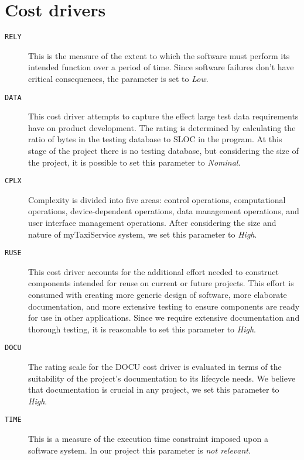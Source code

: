 \section{Cost drivers}

\begin{description}


	\item [\normalfont\texttt{RELY}] This is the measure of the extent to which the software must perform its intended function over a period of time. Since software failures don't have critical consequences, the parameter is set to \emph{Low}.

	\item [\normalfont\texttt{DATA}] This cost driver attempts to capture the effect large test data requirements have on product development. The rating is determined by calculating the ratio of bytes in the testing database to SLOC in the program. At this stage of the project there is no testing database, but considering the size of the project, it is possible to set this parameter to \emph{Nominal}.

	\item [\normalfont\texttt{CPLX}] Complexity is divided into five areas: control operations, computational operations, \mbox{device-dependent} operations, data management operations, and user interface management operations. After considering the size and nature of myTaxiService system, we set this parameter to \emph{High}.

	\item [\normalfont\texttt{RUSE}] This cost driver accounts for the additional effort needed to construct components intended for reuse on current or future projects. This effort is consumed with creating more generic design of software, more elaborate documentation, and more extensive testing to ensure components are ready for use in other applications. Since we require extensive documentation and thorough testing, it is reasonable to set this parameter to \emph{High}.

	\item [\normalfont\texttt{DOCU}] The rating scale for the DOCU cost driver is evaluated in terms of the suitability of the project's documentation to its lifecycle needs. We believe that documentation is crucial in any project, we set this parameter to \emph{High}.

	\item [\normalfont\texttt{TIME}] This is a measure of the execution time constraint imposed upon a software system. In our project this parameter is \emph{not relevant}.


\end{description}
